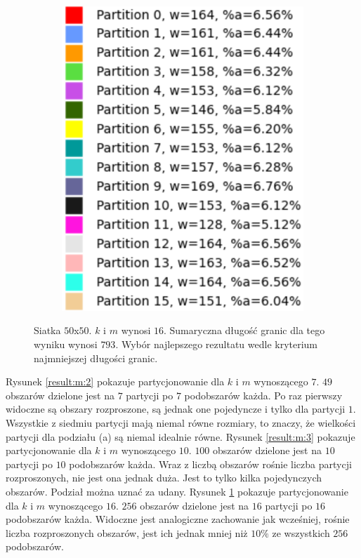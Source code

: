 \begin{figure}[h]
\begin{subfigure}{.33\textwidth}
    \includegraphics[width=0.9\linewidth]{images/results/m/4/results}
    \caption[short]{}
\end{subfigure}
\caption{Siatka $50$x$50$. $k$ i $m$ wynosi $16$.
Sumaryczna długość granic dla tego wyniku wynosi $793$.
Wybór najlepszego rezultatu wedle kryterium najmniejszej długości granic.}
\label{result:m:4}
\end{figure}
\Floatbarrier


Rysunek \ref{result:m:2} pokazuje partycjonowanie dla $k$ i $m$ wynoszącego $7$.
$49$ obszarów dzielone jest na $7$ partycji po $7$ podobszarów każda.
Po raz pierwszy widoczne są obszary rozproszone, są jednak one pojedyncze i tylko dla partycji $1$.
Wszystkie z siedmiu partycji mają niemal równe rozmiary, to znaczy, że wielkości partycji dla podziału (a) są
niemal idealnie równe.
Rysunek \ref{result:m:3} pokazuje partycjonowanie dla $k$ i $m$ wynoszącego $10$.
$100$ obszarów dzielone jest na $10$ partycji po $10$ podobszarów każda.
Wraz z liczbą obszarów rośnie liczba partycji rozproszonych, nie jest ona jednak duża.
Jest to tylko kilka pojedynczych obszarów.
Podział można uznać za udany.
Rysunek \ref{result:m:4} pokazuje partycjonowanie dla $k$ i $m$ wynoszącego $16$.
$256$ obszarów dzielone jest na $16$ partycji po $16$ podobszarów każda.
Widoczne jest analogiczne zachowanie jak wcześniej, rośnie liczba rozproszonych obszarów, jest ich jednak
mniej niż $10\%$ ze wszystkich $256$ podobszarów.


